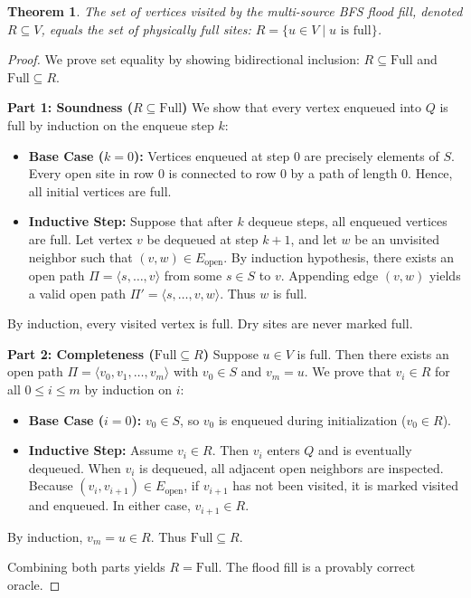 \documentclass[11pt,a4paper]{article}
\newtheorem{theorem}{Theorem}
\begin{document}
\begin{theorem}
The set of vertices visited by the multi-source BFS flood fill, denoted $R \subseteq V$, equals the set of physically full sites: $R = \{u \in V \mid u \text{ is full}\}$.
\end{theorem}
\begin{proof}
We prove set equality by showing bidirectional inclusion: $R \subseteq \text{Full}$ and $\text{Full} \subseteq R$.

\textbf{Part 1: Soundness ($R \subseteq \text{Full}$)}
We show that every vertex enqueued into $Q$ is full by induction on the enqueue step $k$:
\begin{itemize}
    \item \textbf{Base Case ($k=0$):} Vertices enqueued at step $0$ are precisely elements of $S$. Every open site in row $0$ is connected to row $0$ by a path of length $0$. Hence, all initial vertices are full.
    \item \textbf{Inductive Step:} Suppose that after $k$ dequeue steps, all enqueued vertices are full. Let vertex $v$ be dequeued at step $k+1$, and let $w$ be an unvisited neighbor such that $(v, w) \in E_{\text{open}}$. By induction hypothesis, there exists an open path $\Pi = \langle s, \dots, v \rangle$ from some $s \in S$ to $v$. Appending edge $(v, w)$ yields a valid open path $\Pi' = \langle s, \dots, v, w \rangle$. Thus $w$ is full.
\end{itemize}
By induction, every visited vertex is full. Dry sites are never marked full.

\textbf{Part 2: Completeness ($\text{Full} \subseteq R$)}
Suppose $u \in V$ is full. Then there exists an open path $\Pi = \langle v_0, v_1, \dots, v_m \rangle$ with $v_0 \in S$ and $v_m = u$.
We prove that $v_i \in R$ for all $0 \le i \le m$ by induction on $i$:
\begin{itemize}
    \item \textbf{Base Case ($i=0$):} $v_0 \in S$, so $v_0$ is enqueued during initialization ($v_0 \in R$).
    \item \textbf{Inductive Step:} Assume $v_i \in R$. Then $v_i$ enters $Q$ and is eventually dequeued. When $v_i$ is dequeued, all adjacent open neighbors are inspected. Because $(v_i, v_{i+1}) \in E_{\text{open}}$, if $v_{i+1}$ has not been visited, it is marked visited and enqueued. In either case, $v_{i+1} \in R$.
\end{itemize}
By induction, $v_m = u \in R$. Thus $\text{Full} \subseteq R$.

Combining both parts yields $R = \text{Full}$. The flood fill is a provably correct oracle.
\end{proof}
\end{document}
